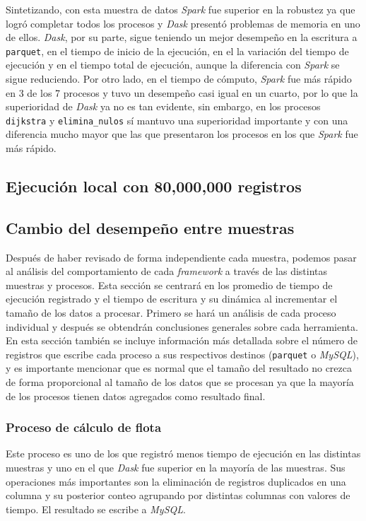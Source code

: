 Sintetizando, con esta muestra de datos \textit{Spark} fue superior en la robustez ya que logró completar todos los procesos y \textit{Dask} presentó problemas de memoria en uno de ellos. \textit{Dask}, por su parte, sigue teniendo un mejor desempeño en la escritura a \texttt{parquet}, en el tiempo de inicio de la ejecución, en el la variación del tiempo de ejecución y en el tiempo total de ejecución, aunque la diferencia con \textit{Spark} se sigue reduciendo. Por otro lado, en el tiempo de cómputo, \textit{Spark} fue más rápido en 3 de los 7 procesos y tuvo un desempeño casi igual en un cuarto, por lo que la superioridad de \textit{Dask} ya no es tan evidente, sin embargo, en los procesos \texttt{dijkstra} y \texttt{elimina\_nulos} sí mantuvo una superioridad importante y con una diferencia mucho mayor que las que presentaron los procesos en los que \textit{Spark} fue más rápido.

\subsection{Ejecución local con 80,000,000 registros}


\subsection{Cambio del desempeño entre muestras}

Después de haber revisado de forma independiente cada muestra, podemos pasar al análisis del comportamiento de cada \textit{framework} a través de las distintas muestras y procesos. Esta sección se centrará en los promedio de tiempo de ejecución registrado y el tiempo de escritura y su dinámica al incrementar el tamaño de los datos a procesar. Primero se hará un análisis de cada proceso individual y después se obtendrán conclusiones generales sobre cada herramienta. En esta sección también se incluye información más detallada sobre el número de registros que escribe cada proceso a sus respectivos destinos (\texttt{parquet} o \textit{MySQL}), y es importante mencionar que es normal que el tamaño del resultado no crezca de forma proporcional al tamaño de los datos que se procesan ya que la mayoría de los procesos tienen datos agregados como resultado final.

\subsubsection{Proceso de cálculo de flota}

Este proceso es uno de los que registró menos tiempo de ejecución en las distintas muestras y uno en el que \textit{Dask} fue superior en la mayoría de las muestras. Sus operaciones más importantes son la eliminación de registros duplicados en una columna y su posterior conteo agrupando por distintas columnas con valores de tiempo. El resultado se escribe a \textit{MySQL}.

